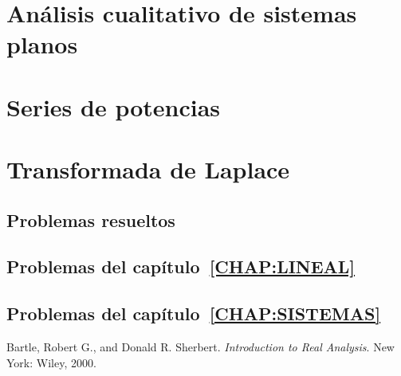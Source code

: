 \documentclass[a4paper, 10pt, openany]{book}
\begin{document}
\chapter{Análisis cualitativo de sistemas planos}
\label{CHAP:CUALITATIVO}


\chapter{Series de potencias}
\label{CHAP:SERIES}


\chapter{Transformada de Laplace}
\label{CHAP:LAPLACE}


\begin{appendices}

\chapter{Problemas resueltos}

\section{Problemas del capítulo~\ref{CHAP:LINEAL}}


\section{Problemas del capítulo~\ref{CHAP:SISTEMAS}}


\end{appendices}

\backmatter

\listoffigures

\listoftables

\begin{thebibliography}{1}
		Bartle, Robert G., and Donald R. Sherbert.
		\textit{Introduction to Real Analysis}. 
		New York: Wiley, 2000. 
\end{thebibliography}
\end{document}
